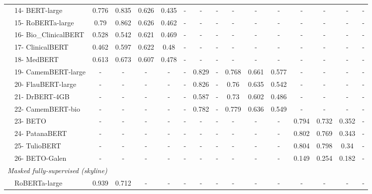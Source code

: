 {\begin{tabular}{ll|ccccc|ccccc|cccc}
 & 14- BERT-large & 0.776 & 0.835 & 0.626 & 0.435 & - & - & - & - & - & - & - & - & - & - \\
 & 15- RoBERTa-large & 0.79 & 0.862 & 0.626 & 0.462 & - & - & - & - & - & - & - & - & - & - \\
 & 16- Bio\_ClinicalBERT & 0.528 & 0.542 & 0.621 & 0.469 & - & - & - & - & - & - & - & - & - & - \\
 & 17- ClinicalBERT & 0.462 & 0.597 & 0.622 & 0.48 & - & - & - & - & - & - & - & - & - & - \\
 & 18- MedBERT & 0.613 & 0.673 & 0.607 & 0.478 & - & - & - & - & - & - & - & - & - & - \\
 & 19- CamemBERT-large & - & - & - & - & - & 0.829 & - & 0.768 & 0.661 & 0.577 & - & - & - & - \\
 & 20- FlauBERT-large & - & - & - & - & - & 0.826 & - & 0.76 & 0.635 & 0.542 & - & - & - & - \\
 & 21- DrBERT-4GB & - & - & - & - & - & 0.587 & - & 0.73 & 0.602 & 0.486 & - & - & - & - \\
 & 22- CamemBERT-bio & - & - & - & - & - & 0.782 & - & 0.779 & 0.636 & 0.549 & - & - & - & - \\
 & 23- BETO & - & - & - & - & - & - & - & - & - & - & 0.794 & 0.732 & 0.352 & - \\
 & 24- PatanaBERT & - & - & - & - & - & - & - & - & - & - & 0.802 & 0.769 & 0.343 & - \\
 & 25- TulioBERT & - & - & - & - & - & - & - & - & - & - & 0.804 & 0.798 & 0.34 & - \\
 & 26- BETO-Galen & - & - & - & - & - & - & - & - & - & - & 0.149 & 0.254 & 0.182 & - \\
\midrule
\midrule
\multicolumn{16}{l}{\textit{Masked fully-supervised (skyline)}} \\
\midrule
 & RoBERTa-large & 0.939 & 0.712 & - & - & - & - & - & - & - & - & - & - & - & - \\
\bottomrule
\end{tabular}}